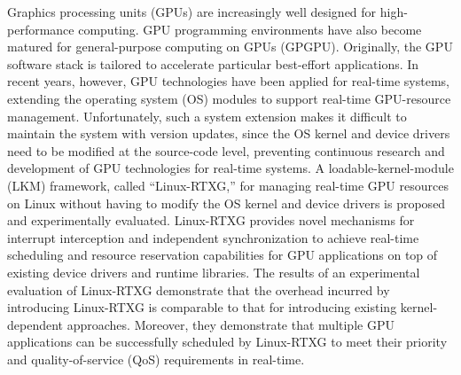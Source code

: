 Graphics processing units (GPUs) are increasingly well designed for high-performance computing.
GPU programming environments have also become matured for general-purpose computing on GPUs (GPGPU).
Originally, the GPU software stack is tailored to accelerate particular best-effort applications.
In recent years, however, GPU technologies have been applied for real-time systems, extending the operating system (OS) modules to support real-time GPU-resource management.
Unfortunately, such a system extension makes it difficult to maintain the system with version updates, since the OS kernel and device drivers need to be modified at the source-code level, preventing continuous research and development of GPU technologies for real-time systems.
A loadable-kernel-module (LKM) framework, called ``Linux-RTXG,'' for managing real-time GPU resources on Linux without having to modify the OS kernel and device drivers is proposed and experimentally evaluated.
Linux-RTXG provides novel mechanisms for interrupt interception and independent synchronization to achieve real-time scheduling and resource reservation capabilities for GPU applications on top of existing device drivers and runtime libraries.
The results of an experimental evaluation of Linux-RTXG demonstrate that the overhead incurred by introducing Linux-RTXG is comparable to that for introducing existing kernel-dependent approaches.
Moreover, they demonstrate that multiple GPU applications can be successfully scheduled by Linux-RTXG to meet their priority and quality-of-service (QoS) requirements in real-time.
